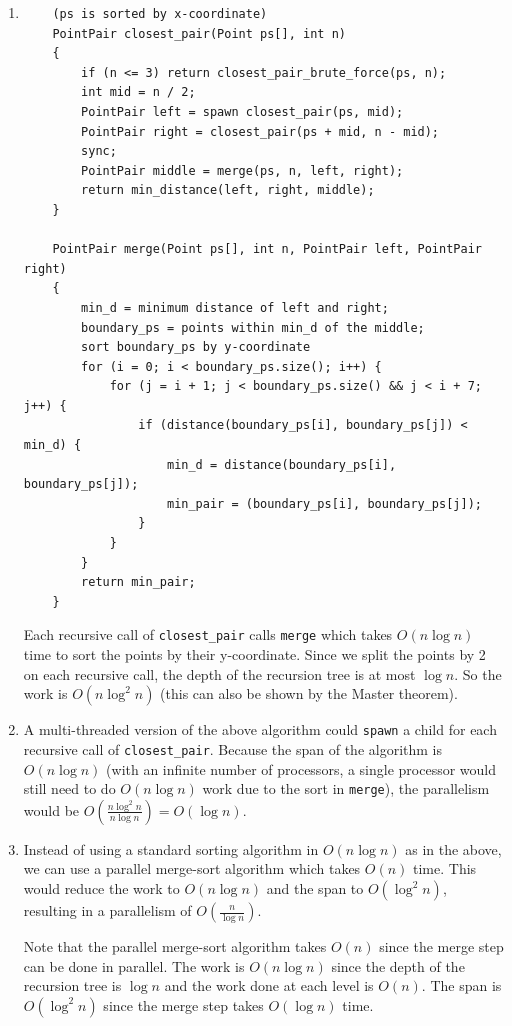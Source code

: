 \documentclass[11pt, letterpaper]{article}
\begin{document}
\begin{enumerate}
  \item \begin{verbatim}
    (ps is sorted by x-coordinate)
    PointPair closest_pair(Point ps[], int n)
    {
        if (n <= 3) return closest_pair_brute_force(ps, n);
        int mid = n / 2;
        PointPair left = spawn closest_pair(ps, mid);
        PointPair right = closest_pair(ps + mid, n - mid);
        sync;
        PointPair middle = merge(ps, n, left, right);
        return min_distance(left, right, middle);
    }

    PointPair merge(Point ps[], int n, PointPair left, PointPair right)
    {
        min_d = minimum distance of left and right;
        boundary_ps = points within min_d of the middle;
        sort boundary_ps by y-coordinate
        for (i = 0; i < boundary_ps.size(); i++) {
            for (j = i + 1; j < boundary_ps.size() && j < i + 7; j++) {
                if (distance(boundary_ps[i], boundary_ps[j]) < min_d) {
                    min_d = distance(boundary_ps[i], boundary_ps[j]);
                    min_pair = (boundary_ps[i], boundary_ps[j]);
                }
            }
        }
        return min_pair;
    }
  \end{verbatim}

  Each recursive call of \verb|closest_pair| calls \verb|merge| which takes $O(n \log n)$ time to sort the points by their y-coordinate. Since we split the points by 2 on each recursive call, the depth of the recursion tree is at most $\log n$. So the work is $O(n \log^2 n)$ (this can also be shown by the Master theorem).

  \item A multi-threaded version of the above algorithm could \verb|spawn| a child for each recursive call of \verb|closest_pair|. Because the span of the algorithm is $O(n \log n)$ (with an infinite number of processors, a single processor would still need to do $O(n \log n)$ work due to the sort in \verb|merge|), the parallelism would be $O(\frac{n \log^2 n}{n \log n}) = O(\log n)$.
  
  \item Instead of using a standard sorting algorithm in $O(n \log n)$ as in the above, we can use a parallel merge-sort algorithm which takes $O(n)$ time. This would reduce the work to $O(n \log n)$ and the span to $O(\log^2 n)$, resulting in a parallelism of $O(\frac{n}{\log n})$.
  
  Note that the parallel merge-sort algorithm takes $O(n)$ since the merge step can be done in parallel. The work is $O(n \log n)$ since the depth of the recursion tree is $\log n$ and the work done at each level is $O(n)$. The span is $O(\log^2 n)$ since the merge step takes $O(\log n)$ time.
  

\end{enumerate}
\end{document}
